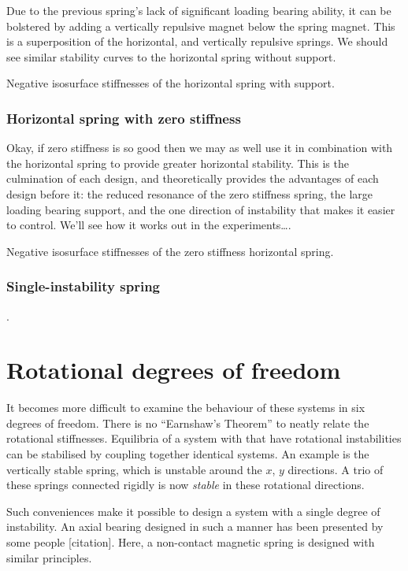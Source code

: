 Due to the previous spring's lack of significant loading bearing ability, it
can be bolstered by adding a vertically repulsive magnet below the spring
magnet. This is a superposition of the horizontal, and vertically repulsive
springs. We should see similar stability curves to the horizontal spring
without support.

  {Negative isosurface stiffnesses of the horizontal spring with support.}

\subsubsection{Horizontal spring with zero stiffness}

Okay, if zero stiffness is so good then we may as well use it in combination
with the horizontal spring to provide greater horizontal stability. This is
the culmination of each design, and theoretically provides the advantages of
each design before it: the reduced resonance of the zero stiffness spring, the
large loading bearing support, and the one direction of instability that makes
it easier to control. We'll see how it works out in the experiments\dots.

  {Negative isosurface stiffnesses of the zero stiffness horizontal spring.}


\subsubsection{Single-instability spring}

\cite{choi2003}. 



\section{Rotational degrees of freedom}

It becomes more difficult to examine the behaviour of these systems in
six degrees of freedom. There is no ``Earnshaw's Theorem'' to neatly
relate the rotational stiffnesses. Equilibria of a system with that
have rotational instabilities can be stabilised by coupling together
identical systems. An example is the vertically stable spring, which
is unstable around the $x$, $y$ directions. A trio of these springs
connected rigidly is now \emph{stable} in these rotational directions.

Such conveniences make it possible to design a system with a single
degree of instability. An axial bearing designed in such a manner has
been presented by some people [citation]. Here, a non-contact magnetic
spring is designed with similar principles.

